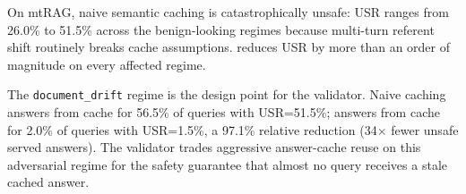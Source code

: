 On mtRAG, naive semantic caching is catastrophically unsafe: USR ranges from 26.0\% to 51.5\% across the benign-looking regimes because multi-turn referent shift routinely breaks cache assumptions. \sys{} reduces USR by more than an order of magnitude on every affected regime.

The \texttt{document\_drift} regime is the design point for the validator. Naive caching answers from cache for 56.5\% of queries with USR=51.5\%; \sys{} answers from cache for 2.0\% of queries with USR=1.5\%, a 97.1\% relative reduction (34$\times$ fewer unsafe served answers). The validator trades aggressive answer-cache reuse on this adversarial regime for the safety guarantee that almost no query receives a stale cached answer.

